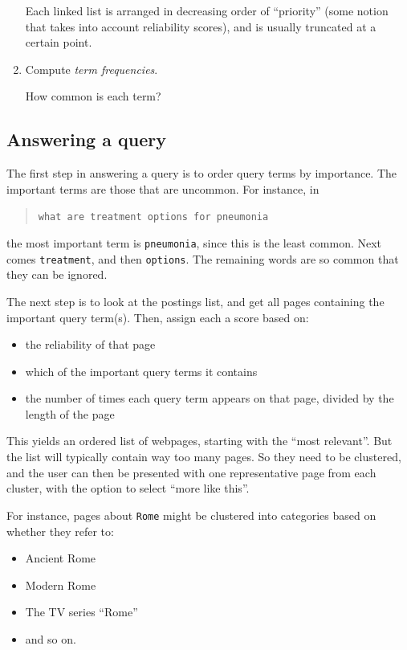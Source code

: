 \begin{enumerate}
Each linked list is arranged in decreasing order of ``priority'' (some notion that takes into account reliability scores), and is usually truncated at a certain point.

\item Compute {\it term frequencies}.

How common is each term?

\end{enumerate}

\subsection{Answering a query}

The first step in answering a query is to order query terms by importance. The important terms are those that are uncommon. For instance, in
\begin{quote}
{\tt what are treatment options for pneumonia}
\end{quote}
the most important term is {\tt pneumonia}, since this is the least common. Next comes {\tt treatment}, and then {\tt options}. The remaining words are so common that they can be ignored.

The next step is to look at the postings list, and get all pages containing the important query term(s). Then, assign each a score based on:
\begin{itemize}
\item the reliability of that page
\item which of the important query terms it contains
\item the number of times each query term appears on that page, divided by the length of the page
\end{itemize}

This yields an ordered list of webpages, starting with the ``most relevant''. But the list will typically contain way too many pages. So they need to be clustered, and the user can then be presented with one representative page from each cluster, with the option to select ``more like this''.

For instance, pages about {\tt Rome} might be clustered into categories based on whether they refer to:
\begin{itemize}
\item Ancient Rome
\item Modern Rome
\item The TV series ``Rome''
\item and so on.
\end{itemize}

